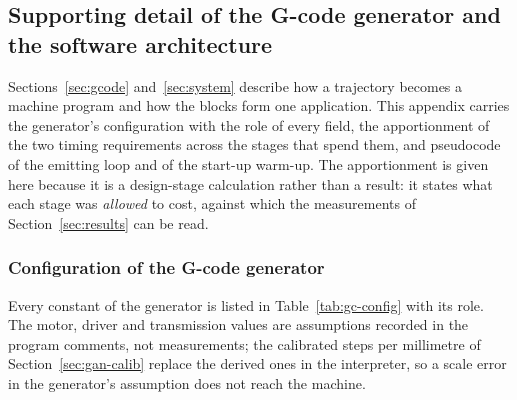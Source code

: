 
\subsection{Supporting detail of the G-code generator and the software architecture}
\label{sec:app-sys}

Sections~\ref{sec:gcode} and~\ref{sec:system} describe how a trajectory becomes a machine program and how the blocks form one application.
This appendix carries the generator's configuration with the role of every field, the apportionment of the two timing requirements across the stages that spend them, and pseudocode of the emitting loop and of the start-up warm-up.
The apportionment is given here because it is a design-stage calculation rather than a result: it states what each stage was \emph{allowed} to cost, against which the measurements of Section~\ref{sec:results} can be read.

\subsubsection{Configuration of the G-code generator}

Every constant of the generator is listed in Table~\ref{tab:gc-config} with its role.
The motor, driver and transmission values are assumptions recorded in the program comments, not measurements; the calibrated steps per millimetre of Section~\ref{sec:gan-calib} replace the derived ones in the interpreter, so a scale error in the generator's assumption does not reach the machine.

